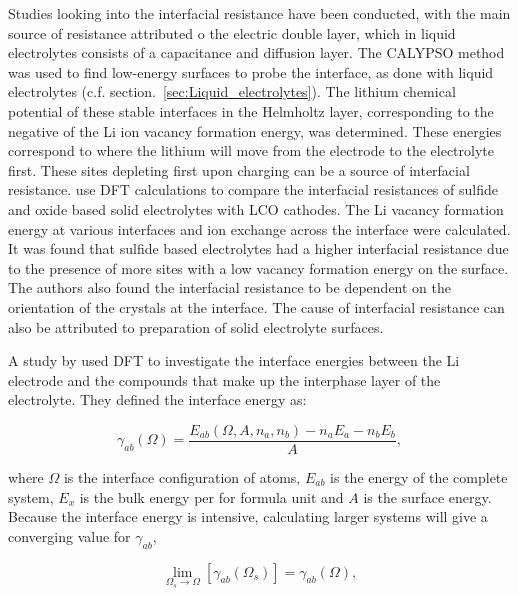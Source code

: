 \documentclass[../main.tex]{subfiles}
\begin{document}
Studies looking into the interfacial resistance have been conducted,\cite{Tateyama2019, Okuno2020, Sharafi2017, Jiang2019} with the main source of resistance attributed o the electric double layer, which in liquid electrolytes consists of a capacitance and diffusion layer.\cite{Tateyama2019} The CALYPSO method was used to find low-energy surfaces\cite{Gao2019} to probe the interface, as done with liquid electrolytes (c.f. section.~\ref{sec:Liquid_electrolytes}). The lithium chemical potential of these stable interfaces in the Helmholtz layer, corresponding to the negative of the Li ion vacancy formation energy, was determined. These energies correspond to where the lithium will move from the electrode to the electrolyte first. These sites depleting first upon charging can be a source of interfacial resistance. \citeauthor{Okuno2020} use DFT calculations to compare the interfacial resistances of sulfide and oxide based solid electrolytes with LCO cathodes.\cite{Okuno2020} The Li vacancy formation energy at various interfaces and ion exchange across the interface were calculated. It was found that sulfide based electrolytes had a higher interfacial resistance due to the presence of more sites with a low vacancy formation energy on the surface. The authors also found the interfacial resistance to be dependent on the orientation of the crystals at the interface. The cause of interfacial resistance can also be attributed to preparation of solid electrolyte surfaces.

A study by \citeauthor{Lepley2015} used DFT to investigate the interface energies between the Li electrode and the compounds that make up the interphase layer of the electrolyte.\cite{Lepley2015} They defined the interface energy as:

\begin{equation}
    \gamma_{ab}(\Omega)=\frac{E_{ab}(\Omega,A,n_a,n_b)-n_aE_a-n_bE_b}{A},
\end{equation}

where $\Omega$ is the interface configuration of atoms, $E_{ab}$ is the energy of the complete system, $E_x$ is the bulk energy per for formula unit and $A$ is the surface energy. Because the interface energy is intensive, calculating larger systems will give a converging value for $\gamma_{ab}$,

\begin{equation}
    \lim_{\Omega_s \rightarrow \Omega} \left[\gamma_{ab}(\Omega_s)\right]=\gamma_{ab}(\Omega),
\end{equation}
\end{document}

